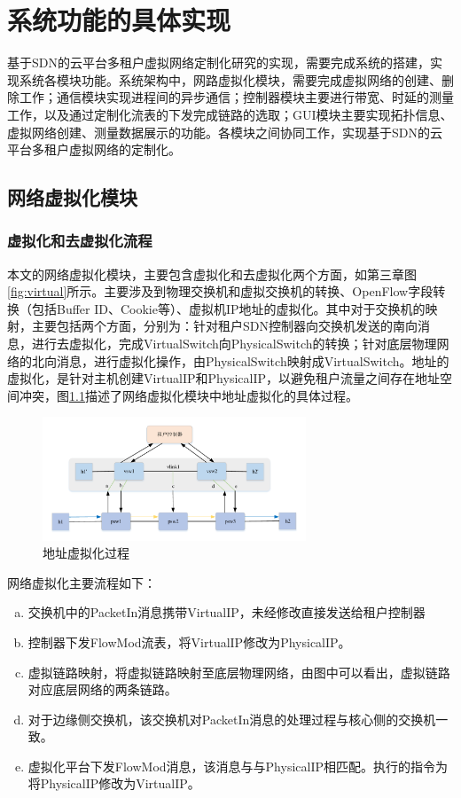 \chapter{系统功能的具体实现}
基于SDN的云平台多租户虚拟网络定制化研究的实现，需要完成系统的搭建，实现系统各模块功能。系统架构中，网路虚拟化模块，需要完成虚拟网络的创建、删除工作；通信模块实现进程间的异步通信；控制器模块主要进行带宽、时延的测量工作，以及通过定制化流表的下发完成链路的选取；GUI模块主要实现拓扑信息、虚拟网络创建、测量数据展示的功能。各模块之间协同工作，实现基于SDN的云平台多租户虚拟网络的定制化。
\section{网络虚拟化模块}
\subsection{虚拟化和去虚拟化流程}
本文的网络虚拟化模块，主要包含虚拟化和去虚拟化两个方面，如第三章图\ref{fig:virtual}所示。主要涉及到物理交换机和虚拟交换机的转换、OpenFlow字段转换（包括Buffer ID、Cookie等）、虚拟机IP地址的虚拟化。其中对于交换机的映射，主要包括两个方面，分别为：针对租户SDN控制器向交换机发送的南向消息，进行去虚拟化，完成VirtualSwitch向PhysicalSwitch的转换；针对底层物理网络的北向消息，进行虚拟化操作，由PhysicalSwitch映射成VirtualSwitch。地址的虚拟化，是针对主机创建VirtualIP和PhysicalIP，以避免租户流量之间存在地址空间冲突，图\ref{fig:addr-vir}描述了网络虚拟化模块中地址虚拟化的具体过程。

\begin{figure}[!htb]
  \centering
  \includegraphics[width=0.7\textwidth]{logo/addr_virt}
  \caption{地址虚拟化过程}
  \label{fig:addr-vir}
\end{figure}

网络虚拟化主要流程如下：
\begin{enumerate}[a)]
\item 交换机中的PacketIn消息携带VirtualIP，未经修改直接发送给租户控制器
\item 控制器下发FlowMod流表，将VirtualIP修改为PhysicalIP。
\item 虚拟链路映射，将虚拟链路映射至底层物理网络，由图中可以看出，虚拟链路对应底层网络的两条链路。
\item 对于边缘侧交换机，该交换机对PacketIn消息的处理过程与核心侧的交换机一致。
\item 虚拟化平台下发FlowMod消息，该消息与与PhysicalIP相匹配。执行的指令为将PhysicalIP修改为VirtualIP。
\end{enumerate}

